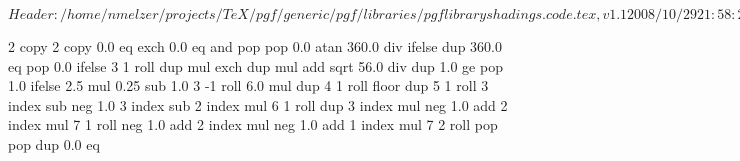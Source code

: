 %
%
%

\ProvidesFileRCS[v\pgfversion] $Header: /home/nmelzer/projects/TeX/pgf/generic/pgf/libraries/pgflibraryshadings.code.tex,v 1.1 2008/10/29 21:58:24 tantau Exp $


%
%

{\pgfpoint{-2cm}{-2cm}}
{\pgfpoint{2cm}{2cm}}
{}
{ %
  2 copy %
  2 copy 0.0 eq exch 0.0 eq and
  { pop pop 0.0 } %
  {atan 360.0 div} %
  ifelse  %
  dup 360.0 eq { pop 0.0 }{} ifelse %
  3 1 roll %
  dup mul %
  exch dup mul %
  add sqrt %
  56.0 div %
  dup 1.0 ge %
  { pop 1.0 }{} ifelse %
  2.5 mul 0.25 sub %
  1.0 %
  3 -1 roll 6.0 mul dup 4 1 roll %
  floor %
  dup 5 1 roll %
  3 index sub neg %
  1.0 3 index sub %
  2 index mul %
  6 1 roll %
  dup 3 index mul neg 1.0 add %
  2 index mul %
  7 1 roll %
  neg 1.0 add %
  2 index mul neg 1.0  add %
  1 index mul %
  7 2 roll %
  pop pop %
  dup 0.0 eq %
}

